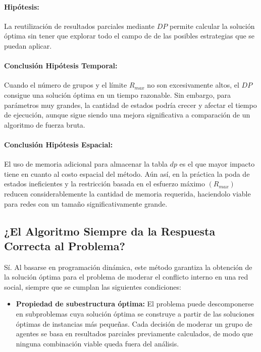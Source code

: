 \documentclass[11pt,letter]{article}
\begin{document}
\begin{itemize}
    \paragraph{Hipótesis:}

    La reutilización de resultados parciales mediante $DP$ permite calcular la solución óptima sin tener que explorar todo el campo de de las posibles estrategias que se puedan aplicar.

    \paragraph{Conclusión Hipótesis Temporal:}

    Cuando el número de grupos y el límite $R_{max}$ no son excesivamente altos, el $DP$ consigue una solución óptima en un tiempo razonable. Sin embargo, para parámetros muy grandes, la cantidad de estados podría crecer y afectar el tiempo de ejecución, aunque sigue siendo una mejora significativa a comparación de un algoritmo de fuerza bruta.

    \paragraph{Conclusión Hipótesis Espacial:}

    El uso de memoria adicional para almacenar la tabla $dp$ es el que mayor impacto tiene en cuanto al costo espacial del método. Aún así, en la práctica la poda de estados ineficientes y la restricción basada en el esfuerzo máximo $(R_{max})$ reducen considerablemente la cantidad de memoria requerida, haciendolo viable para redes con un tamaño significativamente grande.

    \subsection{¿El Algoritmo Siempre da la Respuesta Correcta al Problema?}

    Sí. Al basarse en programación dinámica, este método garantiza la obtención de la solución óptima para el problema de moderar el conflicto interno en una red social, siempre que se cumplan las siguientes condiciones:

    \begin{itemize}

      \item \textbf{Propiedad de subestructura óptima:}
      El problema puede descomponerse en subproblemas cuya solución óptima se construye a partir de las soluciones óptimas de instancias más pequeñas. Cada decisión de moderar un grupo de agentes se basa en resultados parciales previamente calculados, de modo que ninguna combinación viable queda fuera del análisis.


\end{itemize}
\end{itemize}
\end{document}
